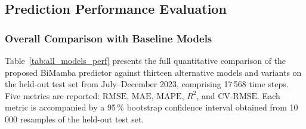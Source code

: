 \documentclass[11pt]{article}
\providecommand{\RMSE}{\text{RMSE}}
\providecommand{\MAE}{\text{MAE}}
\providecommand{\MAPE}{\text{MAPE}}
\providecommand{\Rsq}{R^2}
\providecommand{\CVRMSE}{\text{CV-RMSE}}
\begin{document}
\subsection{Prediction Performance Evaluation}

\subsubsection{Overall Comparison with Baseline Models}

Table~\ref{tab:all_models_perf} presents the full quantitative comparison of the proposed BiMamba predictor against thirteen alternative models and variants on the held-out test set from July--December 2023, comprising 17\,568 time steps. Five metrics are reported: $\RMSE$, $\MAE$, $\MAPE$, $\Rsq$, and $\CVRMSE$. Each metric is accompanied by a 95\,\% bootstrap confidence interval obtained from 10\,000 resamples of the held-out test set.
\end{document}
